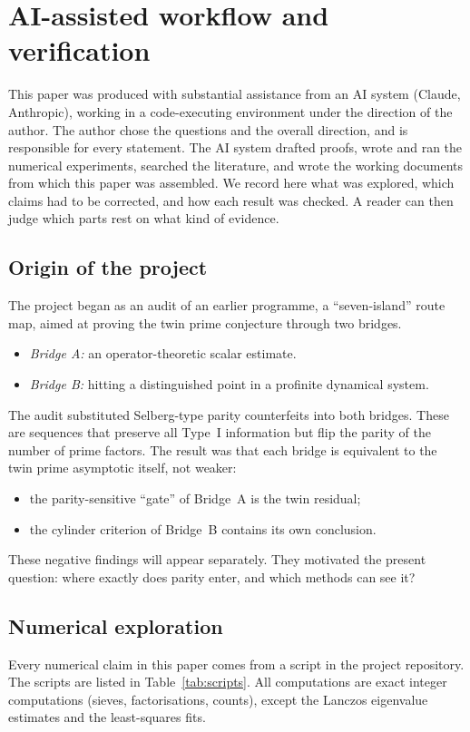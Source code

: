 \section{AI-assisted workflow and verification}\label{app:ai}

This paper was produced with substantial assistance from an AI system (Claude, Anthropic), working in a code-executing environment under the direction of the author. The author chose the questions and the overall direction, and is responsible for every statement. The AI system drafted proofs, wrote and ran the numerical experiments, searched the literature, and wrote the working documents from which this paper was assembled. We record here what was explored, which claims had to be corrected, and how each result was checked. A reader can then judge which parts rest on what kind of evidence.

\subsection{Origin of the project}
The project began as an audit of an earlier programme, a ``seven-island'' route map, aimed at proving the twin prime conjecture through two bridges.
\begin{itemize}
\item \emph{Bridge A:} an operator-theoretic scalar estimate.
\item \emph{Bridge B:} hitting a distinguished point in a profinite dynamical system.
\end{itemize}
The audit substituted Selberg-type parity counterfeits into both bridges. These are sequences that preserve all Type~I information but flip the parity of the number of prime factors. The result was that each bridge is equivalent to the twin prime asymptotic itself, not weaker:
\begin{itemize}
\item the parity-sensitive ``gate'' of Bridge~A is the twin residual;
\item the cylinder criterion of Bridge~B contains its own conclusion.
\end{itemize}
These negative findings will appear separately. They motivated the present question: where exactly does parity enter, and which methods can see it?

\subsection{Numerical exploration}
Every numerical claim in this paper comes from a script in the project repository. The scripts are listed in Table~\ref{tab:scripts}. All computations are exact integer computations (sieves, factorisations, counts), except the Lanczos eigenvalue estimates and the least-squares fits.

